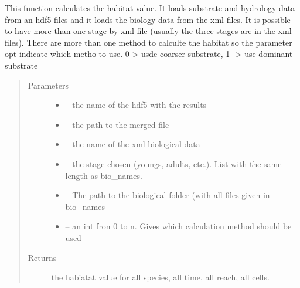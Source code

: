 \documentclass[letterpaper,10pt,english]{sphinxmanual}
\begin{document}
\begin{fulllineitems}
\label{\detokenize{index:src.calcul_hab.calc_hab}}
This function calculates the habitat value. It loads substrate and hydrology data from an hdf5 files and it loads
the biology data from the xml files. It is possible to have more than one stage by xml file (usually the three
stages are in the xml files). There are more than one method to calculte the habitat so the parameter opt indicate
which metho to use. 0-\textgreater{} usde coarser substrate, 1 -\textgreater{} use dominant substrate
\begin{quote}\begin{description}
\item[{Parameters}] \leavevmode\begin{itemize}
\item {} 
 -- the name of the hdf5 with the results

\item {} 
 -- the path to the merged file

\item {} 
 -- the name of the xml biological data

\item {} 
 -- the stage chosen (youngs, adults, etc.). List with the same length as bio\_names.

\item {} 
 -- The path to the biological folder (with all files given in bio\_names

\item {} 
 -- an int fron 0 to n. Gives which calculation method should be used

\end{itemize}

\item[{Returns}] \leavevmode
the habiatat value for all species, all time, all reach, all cells.

\end{description}\end{quote}

\end{fulllineitems}
\end{document}
